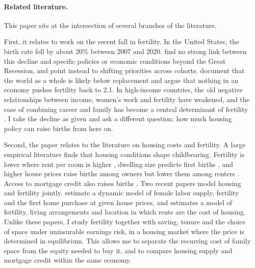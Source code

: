 \paragraph{Related literature.}
This paper sits at the intersection of several branches of the literature.

First, it relates to work on the recent fall in fertility. In the United
States, the birth rate fell by about 20\% between 2007 and 2020.
\citet{kearneyPuzzleFallingUS2022} find no strong link between this decline
and specific policies or economic conditions beyond the Great Recession, and
point instead to shifting priorities across cohorts.
\citet{fernandezVillaverdeNorrickTerraIncognita2026} document that the world
as a whole is likely below replacement and argue that nothing in an economy
pushes fertility back to 2.1. In high-income countries, the old negative
relationships between income, women's work and fertility have weakened, and
the ease of combining career and family has become a central determinant of
fertility \citep{doepkeEconomicsFertilityNew2023}. I take the decline as given
and ask a different question: how much housing policy can raise births from
here on.

Second, the paper relates to the literature on housing costs and fertility. A
large empirical literature finds that housing conditions shape childbearing.
Fertility is lower where rent per room is higher
\citep{simonTamuraHigherRents2009}, dwelling size predicts first births
\citep{stromHousingFirstBirths2010}, and higher house prices raise births
among owners but lower them among renters
\citep{dettlingHousePricesBirth2014,lovenheimFamilyWealthShocks2013}. Access
to mortgage credit also raises births
\citep{hacamoBabiesMortgageDeregulation2021,cummingMonetaryPolicyBirth2024,dettlingKearneyModernMortgage2025,vandoornikFazioRamadoraiSkrastinsHousingFertility2025}.
Two recent papers model housing and fertility jointly.
\citet{khorunzhinaMillerAmericanDream2022} estimate a dynamic model of female
labor supply, fertility and the first home purchase at given house prices,
and \citet{couillardBuildBabyBuild2025} estimates a model of fertility,
living arrangements and location in which rents are the cost of housing.
Unlike these papers, I study fertility together with saving, tenure and the
choice of space under uninsurable earnings risk, in a housing market where
the price is determined in equilibrium. This allows me to separate the
recurring cost of family space from the equity needed to buy it, and to
compare housing supply and mortgage credit within the same economy.

